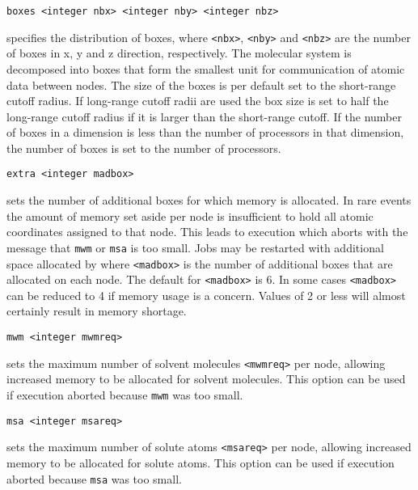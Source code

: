 \begin{description}
\item
\begin{verbatim}
boxes <integer nbx> <integer nby> <integer nbz>
\end{verbatim}
specifies the distribution of boxes,
where \verb+<nbx>+, \verb+<nby>+ and \verb+<nbz>+ are the number of
boxes in x, y and z direction, respectively.
The molecular system is decomposed into boxes that form the smallest
unit for communication of atomic data between nodes. The size of the
boxes is per default set to the short-range cutoff radius. If
long-range cutoff radii  are used the box size is set to half the
long-range cutoff radius if it is larger than the short-range cutoff.
If the number of boxes in a dimension is less than the number of
processors in that dimension, the number of boxes is set to the number
of processors.

\item
\begin{verbatim}
extra <integer madbox>
\end{verbatim}
sets the number of additional boxes for which memory is allocated.
In rare events the amount of memory set aside per node is insufficient
to hold all atomic coordinates assigned to that node. This leads to 
execution which aborts with the message that {\tt mwm} or {\tt msa} is too
small. Jobs may be restarted with additional space allocated by
where \verb+<madbox>+ is the number of additional boxes that are allocated
on each node. The default for \verb+<madbox>+ is 6. 
In some cases \verb+<madbox>+ can be reduced to 4 if memory usage is a
concern. Values of 2 or less will almost certainly result in memory 
shortage.

\item
\begin{verbatim}
mwm <integer mwmreq>
\end{verbatim}
sets the maximum number of solvent molecules \verb+<mwmreq>+ per node,
allowing increased memory to be allocated for solvent molecules. This
option can be used if execution aborted because \verb+mwm+ was too
small.

\item
\begin{verbatim}
msa <integer msareq>
\end{verbatim}
sets the maximum number of solute atoms \verb+<msareq>+ per node,
allowing increased memory to be allocated for solute atoms. This
option can be used if execution aborted because \verb+msa+ was too
small.


\end{description}
